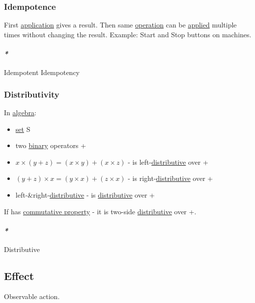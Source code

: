 \documentclass[a4paper,14pt,oneside]{book}
\begin{document}
\subsubsection{\label{org3682e3f}Idempotence}
\label{sec:orge1ba867}
First \hyperref[orgabaffb8]{application} gives a result. Then same \hyperref[org13ebcdd]{operation} can be \hyperref[orgd51b8ca]{applied} multiple times without changing the result.
Example: Start and Stop buttons on machines.

\paragraph{\emph{*}}
\label{sec:org5aa4d9d}

\label{org09df8b7}Idempotent
\label{orgb9368b0}Idempotency

\subsubsection{\label{org2d026d4}Distributivity}
\label{sec:org632fbb3}
In \hyperref[orgc752193]{algebra}:
\begin{itemize}
\item \hyperref[orgdfb804f]{set} S
\item two \hyperref[org25da019]{binary} operators + \texttimes{}

\item \(x \times (y + z) = (x \times y) + (x \times z)\) - \texttimes{} is left-\hyperref[org0813891]{distributive} over +
\item \((y + z) \times x = (y \times x) + (z \times x)\) - \texttimes{} is right-\hyperref[org0813891]{distributive} over +
\item left-\&right-\hyperref[org0813891]{distributive} - \texttimes{} is \hyperref[org0813891]{distributive} over +
\end{itemize}

If \texttimes{} has \hyperref[org4214d09]{commutative property} - it is two-side \hyperref[org0813891]{distributive} over +.

\paragraph{\emph{*}}
\label{sec:orgb9c2750}

\label{org0813891}Distributive

\subsection{\label{orgc4505e7}Effect}
\label{sec:org5cd1663}
Observable action.
\end{document}
